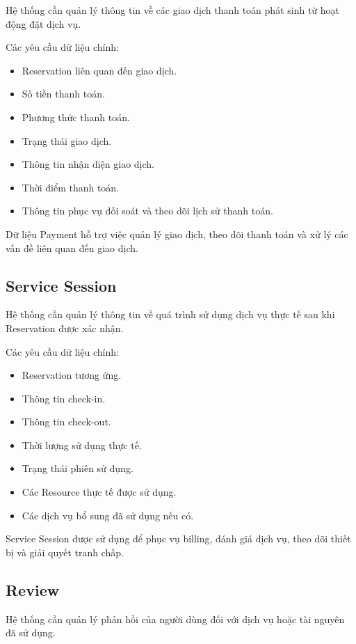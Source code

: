 Hệ thống cần quản lý thông tin về các giao dịch thanh toán phát sinh từ hoạt động đặt dịch vụ.

Các yêu cầu dữ liệu chính:

\begin{itemize}
\item Reservation liên quan đến giao dịch.
\item Số tiền thanh toán.
\item Phương thức thanh toán.
\item Trạng thái giao dịch.
\item Thông tin nhận diện giao dịch.
\item Thời điểm thanh toán.
\item Thông tin phục vụ đối soát và theo dõi lịch sử thanh toán.
\end{itemize}

Dữ liệu Payment hỗ trợ việc quản lý giao dịch, theo dõi thanh toán và xử lý các vấn đề liên quan đến giao dịch.

\subsection{Service Session}

Hệ thống cần quản lý thông tin về quá trình sử dụng dịch vụ thực tế sau khi Reservation được xác nhận.

Các yêu cầu dữ liệu chính:

\begin{itemize}
\item Reservation tương ứng.
\item Thông tin check-in.
\item Thông tin check-out.
\item Thời lượng sử dụng thực tế.
\item Trạng thái phiên sử dụng.
\item Các Resource thực tế được sử dụng.
\item Các dịch vụ bổ sung đã sử dụng nếu có.
\end{itemize}

Service Session được sử dụng để phục vụ billing, đánh giá dịch vụ, theo dõi thiết bị và giải quyết tranh chấp.

\subsection{Review}

Hệ thống cần quản lý phản hồi của người dùng đối với dịch vụ hoặc tài nguyên đã sử dụng.

